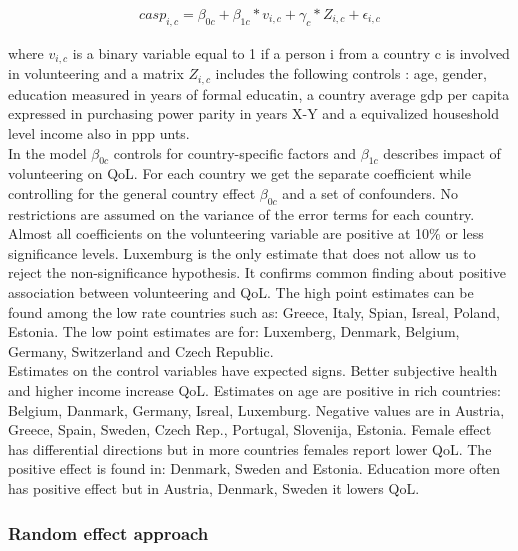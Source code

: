 \documentclass[10pt, letterpaper]{article}
\begin{document}
\begin{spacing}{1.4}
 \begin{eqnarray}
	casp_{i,c}= \beta_{0c}+ \beta_{1c}*v_{i,c} + \gamma_{c}*Z_{i,c} + \epsilon_{i,c}
 \end{eqnarray}

where $v_{i,c}$ is a binary variable equal to 1 if a person i from a country c is involved in  volunteering  and a matrix $Z_{i,c}$ includes the following controls : age, gender, education measured in years of formal educatin, a country average gdp per capita expressed in purchasing power parity in years X-Y and a equivalized houseshold level income also in ppp unts.  \\


In the model $\beta_{0c}$ controls for country-specific factors   and $\beta_{1c}$ describes impact of volunteering on QoL. For each country we get the separate coefficient while controlling for the general country effect $\beta_{0c}$ and a set of confounders. No restrictions are assumed on the variance of the error terms for each country. \\

Almost all coefficients on the volunteering variable are positive at 10\% or less significance levels. Luxemburg is the only estimate that does not allow us to reject the non-significance hypothesis. It confirms common finding about positive association between volunteering and QoL. The high point estimates can be found  among the low rate countries such as: Greece, Italy, Spian, Isreal, Poland, Estonia. The low point estimates are for: Luxemberg, Denmark, Belgium, Germany, Switzerland and Czech Republic. \\

Estimates on the control variables have expected signs. Better subjective health and higher income increase QoL. Estimates on age are positive in rich countries: Belgium, Danmark, Germany, Isreal, Luxemburg. Negative values are in Austria, Greece, Spain, Sweden, Czech Rep., Portugal, Slovenija, Estonia.  Female effect has differential directions but in more countries females report lower QoL. The positive effect is found in: Denmark, Sweden and Estonia. Education more often has positive effect but in Austria, Denmark, Sweden it lowers QoL. \\    





\subsubsection*{ Random effect approach}


\end{spacing}
\end{document}
